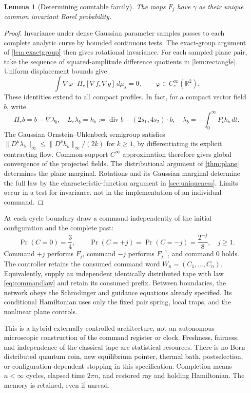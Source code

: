 \documentclass[11pt]{article}
\numberwithin{equation}{section}
\newtheorem{lemma}[lemma]{Lemma}
\theoremstyle{definition}
\newcommand{\R}{\mathbb R}
\newcommand{\diver}{\operatorname{div}}
\begin{document}
\begin{lemma}[Determining countable family]\label{lem:countablelibrary}
The maps $F_j$ have $\gamma$ as their unique common invariant Borel probability.
\end{lemma}
\begin{proof}
Invariance under dense Gaussian parameter samples passes to each complete analytic curve by bounded continuous tests. The exact-group argument of \cref{lem:exactgroup} then gives rotational invariance. For each sampled plane pair, take the sequence of squared-amplitude difference quotients in \cref{lem:rectangle}. Uniform displacement bounds give
\[
 \int\nabla\varphi\cdot\Pi_r[\nabla f,\nabla g]\,d\mu_s=0,
 \qquad \varphi\in C_c^\infty(\R^2).
\]
These identities extend to all compact profiles. In fact, for a compact vector field $b$, write
\[
 \Pi_r b=b-\nabla\lambda_b,\quad
 L_r\lambda_b=h_b:=\diver b-(2s_1,4s_2)\cdot b,
 \quad \lambda_b=-\int_0^\infty P_t h_b\,dt .
\]
The Gaussian Ornstein--Uhlenbeck semigroup satisfies
$\|D^k\lambda_b\|_\infty\le\|D^kh_b\|_\infty/(2k)$ for $k\ge1$, by differentiating its explicit contracting flow. Common-support $C^\infty$ approximation therefore gives global convergence of the projected fields. The distributional argument of \cref{thm:plane} determines the plane marginal. Rotations and its Gaussian marginal determine the full law by the characteristic-function argument in \cref{sec:uniqueness}. Limits occur in a test for invariance, not in the implementation of an individual command.
\end{proof}

At each cycle boundary draw a command independently of the initial configuration and the complete past:
\begin{equation}\label{eq:commandlaw}
 \Pr(C=0)=\frac34,\qquad
 \Pr(C=+j)=\Pr(C=-j)=\frac{2^{-j}}8,\quad j\ge1.
\end{equation}
Command $+j$ performs $F_j$, command $-j$ performs $F_j^{-1}$, and command $0$ holds. The controller retains the consumed command word $W_n=(C_1,\ldots,C_n)$. Equivalently, supply an independent identically distributed tape with law \eqref{eq:commandlaw} and retain its consumed prefix. Between boundaries, the network obeys the Schr\"odinger and guidance equations already specified. Its conditional Hamiltonian uses only the fixed pair spring, local traps, and the nonlinear plane controls.

This is a hybrid externally controlled architecture, not an autonomous microscopic construction of the command register or clock. Freshness, fairness, and independence of the classical tape are statistical resources. There is no Born-distributed quantum coin, new equilibrium pointer, thermal bath, postselection, or configuration-dependent stopping in this specification. Completion means $n<\infty$ cycles, elapsed time $2\pi n$, and restored ray and holding Hamiltonian. The memory is retained, even if unread.
\end{document}
